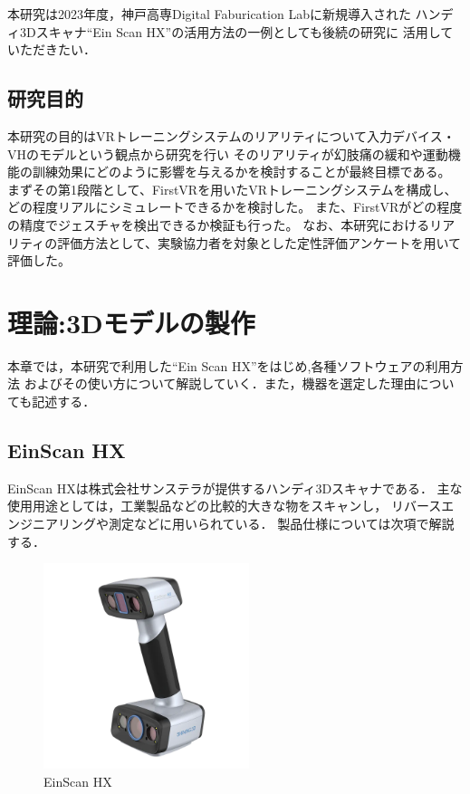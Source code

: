 \documentclass{ltjsreport}
\begin{document}
	本研究は2023年度，神戸高専Digital Faburication Labに新規導入された
	ハンディ3Dスキャナ``Ein Scan HX''\cite{ref:4}の活用方法の一例としても後続の研究に
	活用していただきたい．

	\section{研究目的}
	本研究の目的はVRトレーニングシステムのリアリティについて入力デバイス・VHのモデルという観点から研究を行い
	そのリアリティが幻肢痛の緩和や運動機能の訓練効果にどのように影響を与えるかを検討することが最終目標である。
	まずその第1段階として、FirstVRを用いたVRトレーニングシステムを構成し、どの程度リアルにシミュレートできるかを検討した。
	また、FirstVRがどの程度の精度でジェスチャを検出できるか検証も行った。
	なお、本研究におけるリアリティの評価方法として、実験協力者を対象とした定性評価アンケートを用いて評価した。

\chapter{理論:3Dモデルの製作}
	本章では，本研究で利用した``Ein Scan HX''をはじめ,各種ソフトウェアの利用方法
	およびその使い方について解説していく．また，機器を選定した理由についても記述する．

	\section{EinScan HX}
		EinScan HXは株式会社サンステラが提供するハンディ3Dスキャナである．
		主な使用用途としては，工業製品などの比較的大きな物をスキャンし，
		リバースエンジニアリングや測定などに用いられている．
		製品仕様については次項で解説する．

		\begin{figure}[H]
		\centering
		\includegraphics[width = 6cm]{../figs/EinScan.png}
		\caption{EinScan HX}
		\label{fig:EinScan}
		\end{figure}
\end{document}
